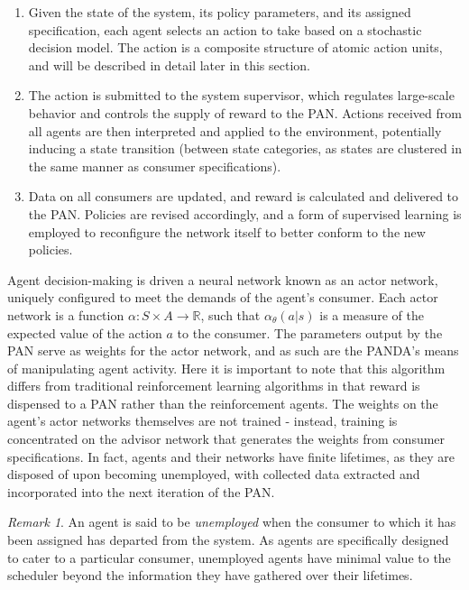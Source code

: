 \documentclass{article}
\theoremstyle{definition}
\theoremstyle{remark}
\newtheorem*{remark}{Remark}
\newcommand{\func}[3]{#1:#2\rightarrow#3}
\begin{document}
			\begin{enumerate}

				\item Given the state of the system, its policy parameters, and its assigned specification, each agent selects an action to take based on a stochastic decision model. The action is a composite structure of atomic action units, and will be described in detail later in this section.

				\item The action is submitted to the system supervisor, which regulates large-scale behavior and controls the supply of reward to the PAN. Actions received from all agents are then interpreted and applied to the environment, potentially inducing a state transition (between state categories, as states are clustered in the same manner as consumer specifications).

				\item Data on all consumers are updated, and reward is calculated and delivered to the PAN. Policies are revised accordingly, and a form of supervised learning is employed to reconfigure the network itself to better conform to the new policies.

			\end{enumerate}

			Agent decision-making is driven a neural network known as an actor network, uniquely configured to meet the demands of the agent's consumer. Each actor network is a function $\func{\alpha}{S \times A}{\mathbb{R}}$, such that $\alpha_\theta(a | s)$ is a measure of the expected value of the action $a$ to the consumer. The parameters output by the PAN serve as weights for the actor network, and as such are the PANDA's means of manipulating agent activity. Here it is important to note that this algorithm differs from traditional reinforcement learning algorithms in that reward is dispensed to a PAN rather than the reinforcement agents. The weights on the agent's actor networks themselves are not trained - instead, training is concentrated on the advisor network that generates the weights from consumer specifications. In fact, agents and their networks have finite lifetimes, as they are disposed of upon becoming unemployed, with collected data extracted and incorporated into the next iteration of the PAN.

			\begin{remark}
				An agent is said to be \emph{unemployed} when the consumer to which it has been assigned has departed from the system. As agents are specifically designed to cater to a particular consumer, unemployed agents have minimal value to the scheduler beyond the information they have gathered over their lifetimes.
			\end{remark}
\end{document}
